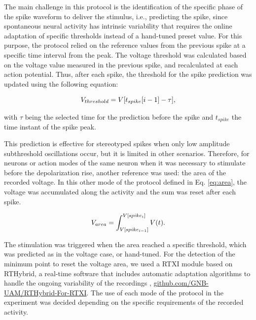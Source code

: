 The main challenge in this protocol is the identification of the specific phase of the spike waveform to deliver the stimulus, i.e., predicting the spike, since spontaneous neural activity has intrinsic variability that requires the online adaptation of specific thresholds instead of a hand-tuned preset value. For this purpose, the protocol relied on the reference values from the previous spike at a specific time interval from the peak. The voltage threshold was calculated based on the voltage value measured in the previous spike, and recalculated at each action potential. Thus, after each spike, the threshold for the spike prediction was updated using the following equation:

\begin{equation}
\centering 
V_{threshold}=V[t_{spike}[i-1]-\tau],
\end{equation}

\noindent with $\tau$ being the selected time for the prediction before the spike and $t_{spike}$ the time instant of the spike peak.

This prediction is effective for stereotyped spikes when only low amplitude subthreshold oscillations occur, but it is limited in other scenarios. Therefore, for neurons or action modes of the same neuron when it was necessary to stimulate before the depolarization rise, another reference was used: the area of the recorded voltage. In this other mode of the protocol defined in Eq. \ref{eq:area}, the voltage was accumulated along the activity and the sum was reset after each spike. 

\begin{equation}
\centering 
V_{area}=\int_{V[spike_{i-1}]}^{V[spike_{i}]}V(t).
\label{eq:area}
\end{equation}

The stimulation was triggered when the area reached a specific threshold, which was predicted as in the voltage case, or hand-tuned. For the detection of the minimum point to reset the voltage area, we used a RTXI module based on RTHybrid, a real-time software that includes automatic adaptation algorithms to handle the ongoing variability of the recordings \parencite{amaducci_rthybrid_2019,reyes-sanchez_automatic_2020,reyes-sanchez_automatized_2023}, \href{https://github.com/GNB-UAM/rthybrid-for-rtxi/tree/master/rthybrid_burst_analysis}{github.com/GNB-UAM/RTHybrid-For-RTXI}. The use of each mode of the protocol in the experiment was decided depending on the specific requirements of the recorded activity. 

